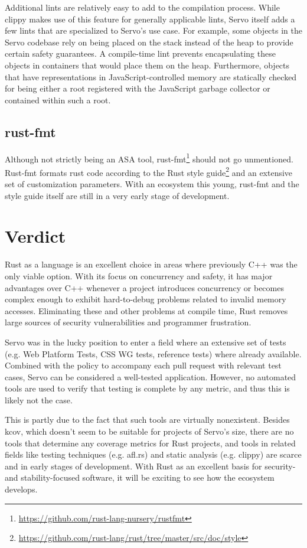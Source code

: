 \documentclass{scrartcl}
\begin{document}
Additional lints are relatively easy to add to the compilation process. While clippy makes use of this feature for generally applicable lints, Servo itself adds a few lints that are specialized to Servo's use case. For example, some objects in the Servo codebase rely on being placed on the stack instead of the heap to provide certain safety guarantees. A compile-time lint prevents encapsulating these objects in containers that would place them on the heap. Furthermore, objects that have representations in JavaScript-controlled memory are statically checked for being either a root registered with the JavaScript garbage collector or contained within such a root.


\subsection{rust-fmt}

Although not strictly being an ASA tool, rust-fmt\footnote{\url{https://github.com/rust-lang-nursery/rustfmt}} should not go unmentioned. Rust-fmt formats rust code according to the Rust style guide\footnote{\url{https://github.com/rust-lang/rust/tree/master/src/doc/style}} and an extensive set of customization parameters. With an ecosystem this young, rust-fmt and the style guide itself are still in a very early stage of development.



\newpage

\section{Verdict}

Rust as a language is an excellent choice in areas where previously C++ was the only viable option. With its focus on concurrency and safety, it has major advantages over C++ whenever a project introduces concurrency or becomes complex enough to exhibit hard-to-debug problems related to invalid memory accesses. Eliminating these and other problems at compile time, Rust removes large sources of security vulnerabilities and programmer frustration.

Servo was in the lucky position to enter a field where an extensive set of tests (e.g. Web Platform Tests, CSS WG tests, reference tests) where already available. Combined with the policy to accompany each pull request with relevant test cases, Servo can be considered a well-tested application. However, no automated tools are used to verify that testing is complete by any metric, and thus this is likely not the case.

This is partly due to the fact that such tools are virtually nonexistent. Besides kcov, which doesn't seem to be suitable for projects of Servo's size, there are no tools that determine any coverage metrics for Rust projects, and tools in related fields like testing techniques (e.g. afl.rs) and static analysis (e.g. clippy) are scarce and in early stages of development. With Rust as an excellent basis for security- and stability-focused software, it will be exciting to see how the ecosystem develops.
\end{document}
